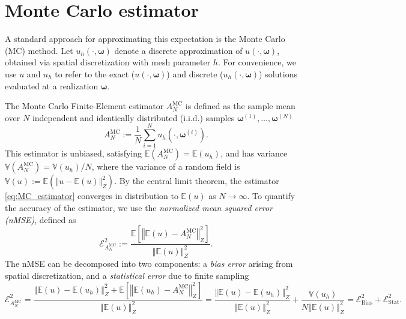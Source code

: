 \section{Monte Carlo estimator}\label{sec:MC}
A standard approach for approximating this expectation is the Monte Carlo (MC) method. Let $u_h (\cdot, \boldsymbol{\omega})$ denote a discrete approximation of $u(\cdot, \boldsymbol{\omega})$, obtained via spatial discretization with mesh parameter $h$.  For convenience, we use $u$ and $u_h$ to refer to the exact ($u(\cdot,\boldsymbol \omega)$) and discrete ($u_h(\cdot,\boldsymbol \omega)$) solutions evaluated at a realization $\boldsymbol \omega$.

The Monte Carlo Finite-Element estimator $A^{\text{MC}}_{N}$ is defined as the sample mean over $N$ independent and identically distributed (i.i.d.) samples $\boldsymbol{\omega}^{(1)},\ldots,\boldsymbol{\omega}^{(N)}$
%
\begin{equation}\label{eq:MC_estimator}
    A^{\text{MC}}_{N} := \frac{1}{N}\sum_{i=1}^{N} u_{h}\left(\cdot, \boldsymbol{\omega}^{(i)}\right).
\end{equation}
%
This estimator is unbiased, satisfying $\mathbb{E}(A^{\text{MC}}_{N}) = \mathbb{E}(u_{h})$, and has variance $\mathbb{V}(A^{\text{MC}}_{N}) = \mathbb{V}( u_{h})/{N}$, where the variance of a random field is $\mathbb{V}(u) := \mathbb{E}(\left\Vert u - \mathbb{E}(u)\right\Vert_Z^2)$. By the central limit theorem, the estimator \eqref{eq:MC_estimator} converges in distribution to $\mathbb{E}(u)$ as $N\rightarrow \infty$. To quantify the accuracy of the estimator, we use the  {\it normalized mean squared error (nMSE)}, defined as
%
 \[
\mathcal{E}_{A^{\text{MC}}_{N}}^2:=\frac{\mathbb E\left[\left\Vert\mathbb{E}(u)-A^{\text{MC}}_{N} \right\Vert_{Z}^2\right]}{\left\Vert\mathbb{E}(u) \right\Vert_{Z}^2}.
\] 
%
The nMSE can be decomposed into two components: a {\it bias error} arising from spatial discretization, and a {\it statistical error} due to finite sampling
%
\[
\mathcal{E}_{A^{\text{MC}}_{N}}^2 = \frac{\left\Vert\mathbb{E}(u)-\mathbb{E}(u_{h}) \right\Vert_{Z}^2+\mathbb E\left[\left\Vert \mathbb{E}(u_{h}) -A^{\text{MC}}_{N} \right\Vert_{Z}^2\right]}{\left\Vert\mathbb{E}(u) \right\Vert_{Z}^2} = \frac{\left\Vert\mathbb{E}(u)-\mathbb{E}(u_{h}) \right\Vert_{Z}^2}{\left\Vert\mathbb{E}(u) \right\Vert_{Z}^2}+\frac{\mathbb{V}\left( u_{h}\right)}{N\left\Vert\mathbb{E}(u) \right\Vert_{Z}^2}=\mathcal{E}_{\text{Bias}}^2 + \mathcal{E}_{\text{Stat}}^2.
\]
